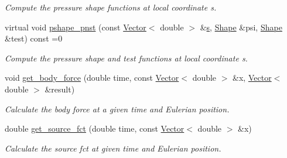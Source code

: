 \begin{DoxyCompactItemize}
\begin{DoxyCompactList}\small\item\em Compute the pressure shape functions at local coordinate s. \end{DoxyCompactList}\item 
virtual void \hyperlink{classoomph_1_1PolarNavierStokesEquations_a2ec5597d86a5f93615d4a29f0a01ebf7}{pshape\+\_\+pnst} (const \hyperlink{classoomph_1_1Vector}{Vector}$<$ double $>$ \&\hyperlink{cfortran_8h_ab7123126e4885ef647dd9c6e3807a21c}{s}, \hyperlink{classoomph_1_1Shape}{Shape} \&psi, \hyperlink{classoomph_1_1Shape}{Shape} \&test) const =0
\begin{DoxyCompactList}\small\item\em Compute the pressure shape and test functions at local coordinate s. \end{DoxyCompactList}\item 
void \hyperlink{classoomph_1_1PolarNavierStokesEquations_a7b8e7dac6fe147c271230d34ef5cf450}{get\+\_\+body\+\_\+force} (double time, const \hyperlink{classoomph_1_1Vector}{Vector}$<$ double $>$ \&x, \hyperlink{classoomph_1_1Vector}{Vector}$<$ double $>$ \&result)
\begin{DoxyCompactList}\small\item\em Calculate the body force at a given time and Eulerian position. \end{DoxyCompactList}\item 
double \hyperlink{classoomph_1_1PolarNavierStokesEquations_a6b9fb7f70c3a1858ee4c56bea63d8be2}{get\+\_\+source\+\_\+fct} (double time, const \hyperlink{classoomph_1_1Vector}{Vector}$<$ double $>$ \&x)
\begin{DoxyCompactList}\small\item\em Calculate the source fct at given time and Eulerian position. \end{DoxyCompactList}\end{DoxyCompactItemize}
